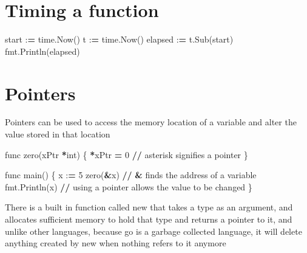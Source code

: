 \documentclass[]{book}
\newenvironment{Shaded}{\begin{snugshade}}{\end{snugshade}}
\newcommand{\DecValTok}[1]{\textcolor[rgb]{0.00,0.00,0.81}{#1}}
\newcommand{\OperatorTok}[1]{\textcolor[rgb]{0.81,0.36,0.00}{\textbf{#1}}}
\newcommand{\BuiltInTok}[1]{#1}
\newcommand{\NormalTok}[1]{#1}
\begin{document}
\section{Timing a function}\label{timing-a-function}

\begin{Shaded}
\begin{Highlighting}[]
\NormalTok{start :}\OperatorTok{=}\NormalTok{ time.Now()}
\NormalTok{t :}\OperatorTok{=}\NormalTok{ time.Now()}
\NormalTok{elapsed :}\OperatorTok{=}\NormalTok{ t.Sub(start)}
\NormalTok{fmt.Println(elapsed)}
\end{Highlighting}
\end{Shaded}

\section{Pointers}\label{pointers}

Pointers can be used to access the memory location of a variable and
alter the value stored in that location

\begin{Shaded}
\begin{Highlighting}[]
\NormalTok{func zero(xPtr }\OperatorTok{*}\BuiltInTok{int}\NormalTok{) \{                                              }
    \OperatorTok{*}\NormalTok{xPtr }\OperatorTok{=} \DecValTok{0} \OperatorTok{//}\NormalTok{ asterisk signifies a pointer                                                       }
\NormalTok{\}                                                                   }
                                                                    
\NormalTok{func main() \{                                                       }
\NormalTok{    x :}\OperatorTok{=} \DecValTok{5}                                                          
\NormalTok{    zero(}\OperatorTok{&}\NormalTok{x) }\OperatorTok{//} \OperatorTok{&}\NormalTok{ finds the address of a variable                                                       }
\NormalTok{    fmt.Println(x) }\OperatorTok{//}\NormalTok{ using a pointer allows the value to be changed}
\NormalTok{\}                                                                   }
\end{Highlighting}
\end{Shaded}

There is a built in function called new that takes a type as an
argument, and allocates sufficient memory to hold that type and returns
a pointer to it, and unlike other languages, because go is a garbage
collected language, it will delete anything created by new when nothing
refers to it anymore
\end{document}
